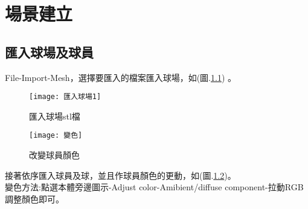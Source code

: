 \chapter{場景建立}
\section{匯入球場及球員}
File-Import-Mesh，選擇要匯入的檔案匯入球場，如(圖.\ref{匯入球場stl檔}) 。\\
\begin{figure}[hbt!]
\begin{center}
\texttt{[image: 匯入球場1]}
\caption{\Large 匯入球場stl檔}\label{匯入球場stl檔}
\end{center}
\end{figure} 
\begin{figure}[hbt!]
\begin{center}
\texttt{[image: 變色]}
\caption{\Large 改變球員顏色}\label{改變球員顏色}
\end{center}
\end{figure} 
接著依序匯入球員及球，並且作球員顏色的更動，如(圖.\ref{改變球員顏色})。\\
變色方法:點選本體旁邊圖示-Adjust color-Amibient/diffuse component-拉動RGB調整顏色即可。\\
\newpage
